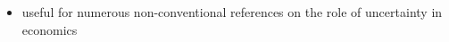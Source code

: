 \begin{itemize}
\begin{itemize}
\item useful for numerous non-conventional references on the role of uncertainty in economics
\end{itemize}

\end{itemize}





